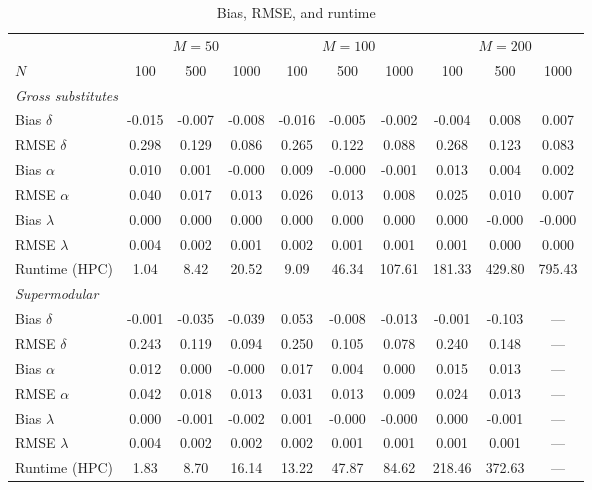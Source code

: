 \begin{table}[htbp]
\centering
\footnotesize
\caption{Bias, RMSE, and runtime}
\label{tab:benchmarks}
\begin{threeparttable}
\begin{tabular}{l c c c c c c c c c}
\toprule
 & \multicolumn{3}{c}{$M = 50$} & \multicolumn{3}{c}{$M = 100$} & \multicolumn{3}{c}{$M = 200$} \\
\cmidrule(lr){2-4} \cmidrule(lr){5-7} \cmidrule(lr){8-10}
$N$ & 100 & 500 & 1000 & 100 & 500 & 1000 & 100 & 500 & 1000 \\
\midrule
\multicolumn{10}{l}{\textit{Gross substitutes}} \\[2pt]
Bias $\delta$ & -0.015 & -0.007 & -0.008 & -0.016 & -0.005 & -0.002 & -0.004 & 0.008 & 0.007 \\
RMSE $\delta$ & 0.298 & 0.129 & 0.086 & 0.265 & 0.122 & 0.088 & 0.268 & 0.123 & 0.083 \\
Bias $\alpha$ & 0.010 & 0.001 & -0.000 & 0.009 & -0.000 & -0.001 & 0.013 & 0.004 & 0.002 \\
RMSE $\alpha$ & 0.040 & 0.017 & 0.013 & 0.026 & 0.013 & 0.008 & 0.025 & 0.010 & 0.007 \\
Bias $\lambda$ & 0.000 & 0.000 & 0.000 & 0.000 & 0.000 & 0.000 & 0.000 & -0.000 & -0.000 \\
RMSE $\lambda$ & 0.004 & 0.002 & 0.001 & 0.002 & 0.001 & 0.001 & 0.001 & 0.000 & 0.000 \\
Runtime (HPC) & 1.04 & 8.42 & 20.52 & 9.09 & 46.34 & 107.61 & 181.33 & 429.80 & 795.43 \\[4pt]
\multicolumn{10}{l}{\textit{Supermodular}} \\[2pt]
Bias $\delta$ & -0.001 & -0.035 & -0.039 & 0.053 & -0.008 & -0.013 & -0.001 & -0.103 & --- \\
RMSE $\delta$ & 0.243 & 0.119 & 0.094 & 0.250 & 0.105 & 0.078 & 0.240 & 0.148 & --- \\
Bias $\alpha$ & 0.012 & 0.000 & -0.000 & 0.017 & 0.004 & 0.000 & 0.015 & 0.013 & --- \\
RMSE $\alpha$ & 0.042 & 0.018 & 0.013 & 0.031 & 0.013 & 0.009 & 0.024 & 0.013 & --- \\
Bias $\lambda$ & 0.000 & -0.001 & -0.002 & 0.001 & -0.000 & -0.000 & 0.000 & -0.001 & --- \\
RMSE $\lambda$ & 0.004 & 0.002 & 0.002 & 0.002 & 0.001 & 0.001 & 0.001 & 0.001 & --- \\
Runtime (HPC) & 1.83 & 8.70 & 16.14 & 13.22 & 47.87 & 84.62 & 218.46 & 372.63 & --- \\[4pt]

\end{tabular}
\end{threeparttable}
\end{table}
